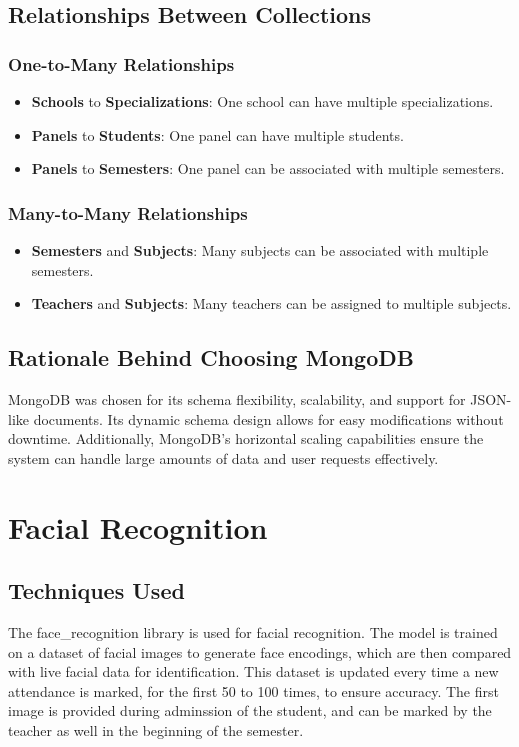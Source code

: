\documentclass[conference]{IEEEtran}
\begin{document}
\subsection{Relationships Between Collections}
\subsubsection{One-to-Many Relationships}
\begin{itemize}
    \item \textbf{Schools} to \textbf{Specializations}: One school can have multiple specializations.
    \item \textbf{Panels} to \textbf{Students}: One panel can have multiple students.
    \item \textbf{Panels} to \textbf{Semesters}: One panel can be associated with multiple semesters.
\end{itemize}

\subsubsection{Many-to-Many Relationships}
\begin{itemize}
    \item \textbf{Semesters} and \textbf{Subjects}: Many subjects can be associated with multiple semesters.
    \item \textbf{Teachers} and \textbf{Subjects}: Many teachers can be assigned to multiple subjects.
\end{itemize}

\subsection{Rationale Behind Choosing MongoDB}
MongoDB was chosen for its schema flexibility, scalability, and support for JSON-like documents. Its dynamic schema design allows for easy modifications without downtime. Additionally, MongoDB's horizontal scaling capabilities ensure the system can handle large amounts of data and user requests effectively.

\section{Facial Recognition}

\subsection{Techniques Used}
The face\_recognition \cite{6} library is used for facial recognition. The model is trained on a dataset of facial images to generate face encodings, which are then compared with live facial data for identification. This dataset is updated every time a new attendance is marked, for the first 50 to 100 times, to ensure accuracy. The first image is provided during adminssion of the student, and can be marked by the teacher as well in the beginning of the semester.
\end{document}
